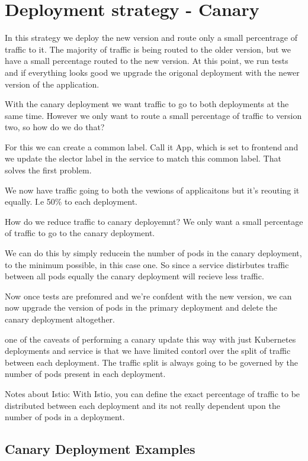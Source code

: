 \documentclass[11pt]{book}
\begin{document}
    \section{Deployment strategy - Canary}
    In this strategy we deploy the new version and route only a small percentrage of traffic to it.
    The majority of traffic is being routed to the older version, but we have a small percentage routed to the new version.
    At this point, we run tests and if everything looks good we upgrade the origonal deployment with the newer version of the application.

    With the canary deployment we want traffic to go to both deployments at the same time.
    However we only want to route a small percentage of traffic to version two, so how do we do that?

    For this we can create a common label.
    Call it App, which is set to frontend and we update the slector label in the service to match this common label.
    That solves the first problem.

    We now have traffic going to both the vewions of applicaitons but it's reouting it equally. I.e 50\% to each deployment.

    How do we reduce traffic to canary deployemnt?
    We only want a small percentage of traffic to go to the canary deployment.

    We can do this by simply reducein the number of pods in the canary deployment, to the minimum possible, in this case one.
    So since a service distirbutes traffic between all pods equally the canary deployment will recieve less traffic.

    Now once tests are prefomred and we're confdent with the new version, we can now upgrade the version of pods in the primary deployment and delete the canary deployment altogether.

    one of the caveats of performing a canary update this way with just Kubernetes deployments and service is that we have limited contorl over the split of traffic between each deployment.
    The traffic split is always going to be governed by the number of pods present in each deployment.

    Notes about Istio:
    With Istio, you can define the exact percentage of traffic to be distributed between each deployment
    and its not really dependent upon the number of pods in a deployment.

    \subsection{Canary Deployment Examples}
\end{document}
